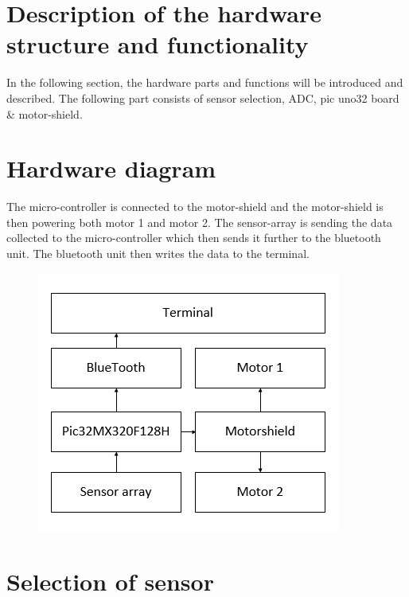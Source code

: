 \section{Description of the hardware structure and functionality}
In the following section, the hardware parts and functions will be introduced and described. The following part consists of sensor selection, ADC, pic uno32 board \& motor-shield.

\section{Hardware diagram}
The micro-controller is connected to the motor-shield and the motor-shield is then powering both motor 1 and motor 2. The sensor-array is sending the data collected to the micro-controller which then sends it further to the bluetooth unit. The bluetooth unit then writes the data to the terminal. 

 \begin{figure}[!ht]
    	\centering    		\includegraphics[width=.6\textwidth]{figures/hardwaredia2.png}
    	\caption{}
    	\label{Hardware diagram}
    \end{figure}

\section{Selection of sensor}

